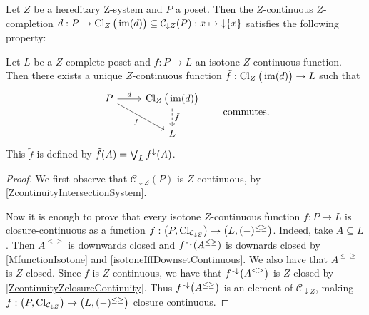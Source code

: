 \begin{corollary} \label{ZcontinuousExtensionZcontinuousFunction}
Let $Z$ be a hereditary $\mathrm{Z}$-system and $P$ a poset. Then the $Z$-continuous $Z$-completion $d: P \to \operatorname{Cl}_{Z}\big(\operatorname{im}(d)\big) \subseteq \mathcal{C}_{\downarrow Z}(P): x\mapsto \operatorname{\downarrow}\{x\}$ satisfies the following property:

Let $L$ be a $Z$-complete poset and $f: P \to L$ an isotone $Z$-continuous function. Then there exists a unique $Z$-continuous function $\tilde{f}: \operatorname{Cl}_{Z}\big(\operatorname{im}(d)\big) \to L$ such that
\[ \begin{tikzcd}
P \ar[r, "d"] \ar[dr, swap, "f"] & \Closure_{Z}\big(\im(d)\big) \ar[d, dashed, "{\tilde{f}}"] \\ {} & L
\end{tikzcd} \qquad \text{commutes.} \]
This $\tilde{f}$ is defined by $\tilde{f}(A) = \bigvee_L f^\downarrow(A)$.
\end{corollary}
\begin{proof}
We first observe that $\mathcal{C}_{\downarrow Z}(P)$ is $Z$-continuous, by \ref{ZcontinuityIntersectionSystem}.

Now it is enough to prove that every isotone $Z$-continuous function $f: P \to L$ is closure-continuous as a function $f: \sSet{P, \Closure_{\mathcal{C}_{\downarrow Z}}}\to \sSet{L, (-)^{\leq\geq}}$. Indeed, take $A\subseteq L$. Then $A^{\leq\geq}$ is downwards closed and $f^{\text{\hspace{0.15em}-}\downarrow}(A^{\leq\geq})$ is downards closed by \ref{MfunctionIsotone} and \ref{isotoneIffDownsetContinuous}. We also have that $A^{\leq\geq}$ is $Z$-closed. Since $f$ is $Z$-continuous, we have that $f^{\text{\hspace{0.15em}-}\downarrow}\big(A^{\leq\geq}\big)$ is $Z$-closed by \ref{ZcontinuityZclosureContinuity}. Thus $f^{\text{\hspace{0.15em}-}\downarrow}\big(A^{\leq\geq}\big)$ is an element of $\mathcal{C}_{\downarrow Z}$, making $f: \sSet{P, \Closure_{\mathcal{C}_{\downarrow Z}}}\to \sSet{L, (-)^{\leq\geq}}$ closure continuous.
\end{proof}



